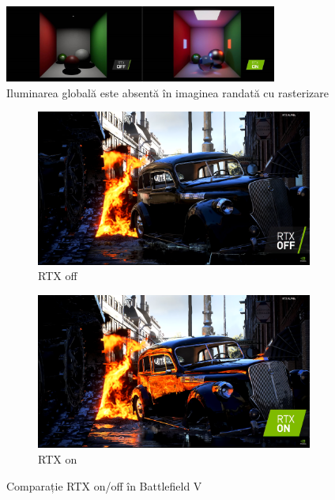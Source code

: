\documentclass[12pt,a4paper]{report}
\begin{document}
\begin{figure}[ht]
	\centering
	\includegraphics[width=0.8\textwidth]{pics/cornell-raster.jpg}
	\caption{Iluminarea globală este absentă în imaginea randată cu rasterizare\protect\footnotemark}
	\vspace{1cm}
	\label{fig:cornell-raster}
\end{figure}

\begin{figure}[ht]
	\centering
	\begin{subfigure}[h]{0.45\linewidth}
		\centering
		\includegraphics[width=\linewidth]{pics/bf5-rtx-off.png}
		\caption{RTX off}
	\end{subfigure}
	\hfill
	\begin{subfigure}[h]{0.45\linewidth}
		\centering
		\includegraphics[width=\linewidth]{pics/bf5-rtx-on.png}
		\caption{RTX on}
	\end{subfigure}
	\caption{Comparație RTX on/off în Battlefield V\protect\footnotemark}
	\label{fig:bf5-rtx}
\end{figure}
\end{document}
